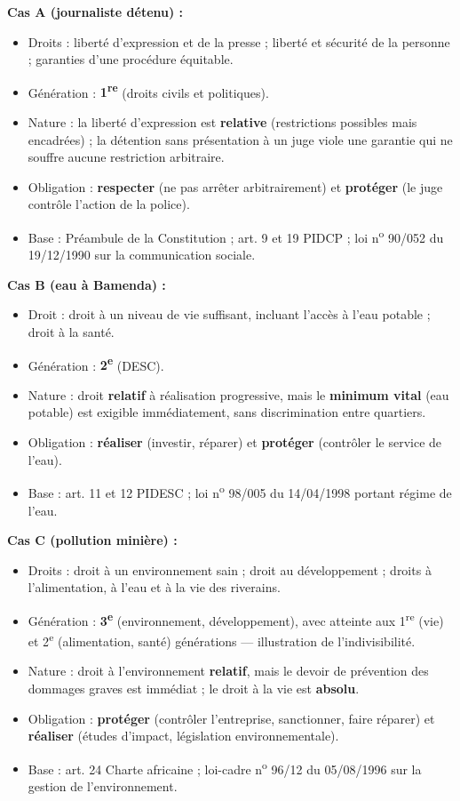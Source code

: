 \documentclass[11pt]{article}
\begin{document}
\begin{corrige}
\textbf{Cas A (journaliste détenu) :}
\begin{itemize}
    \item Droits : liberté d'expression et de la presse ; liberté et sécurité de la personne ; garanties d'une procédure équitable.
    \item Génération : \textbf{1\textsuperscript{re}} (droits civils et politiques).
    \item Nature : la liberté d'expression est \textbf{relative} (restrictions possibles mais encadrées) ; la détention sans présentation à un juge viole une garantie qui ne souffre aucune restriction arbitraire.
    \item Obligation : \textbf{respecter} (ne pas arrêter arbitrairement) et \textbf{protéger} (le juge contrôle l'action de la police).
    \item Base : Préambule de la Constitution ; art. 9 et 19 PIDCP ; loi n\textsuperscript{o} 90/052 du 19/12/1990 sur la communication sociale.
\end{itemize}

\textbf{Cas B (eau à Bamenda) :}
\begin{itemize}
    \item Droit : droit à un niveau de vie suffisant, incluant l'accès à l'eau potable ; droit à la santé.
    \item Génération : \textbf{2\textsuperscript{e}} (DESC).
    \item Nature : droit \textbf{relatif} à réalisation progressive, mais le \textbf{minimum vital} (eau potable) est exigible immédiatement, sans discrimination entre quartiers.
    \item Obligation : \textbf{réaliser} (investir, réparer) et \textbf{protéger} (contrôler le service de l'eau).
    \item Base : art. 11 et 12 PIDESC ; loi n\textsuperscript{o} 98/005 du 14/04/1998 portant régime de l'eau.
\end{itemize}

\textbf{Cas C (pollution minière) :}
\begin{itemize}
    \item Droits : droit à un environnement sain ; droit au développement ; droits à l'alimentation, à l'eau et à la vie des riverains.
    \item Génération : \textbf{3\textsuperscript{e}} (environnement, développement), avec atteinte aux 1\textsuperscript{re} (vie) et 2\textsuperscript{e} (alimentation, santé) générations — illustration de l'indivisibilité.
    \item Nature : droit à l'environnement \textbf{relatif}, mais le devoir de prévention des dommages graves est immédiat ; le droit à la vie est \textbf{absolu}.
    \item Obligation : \textbf{protéger} (contrôler l'entreprise, sanctionner, faire réparer) et \textbf{réaliser} (études d'impact, législation environnementale).
    \item Base : art. 24 Charte africaine ; loi-cadre n\textsuperscript{o} 96/12 du 05/08/1996 sur la gestion de l'environnement.
\end{itemize}


\end{corrige}
\end{document}
